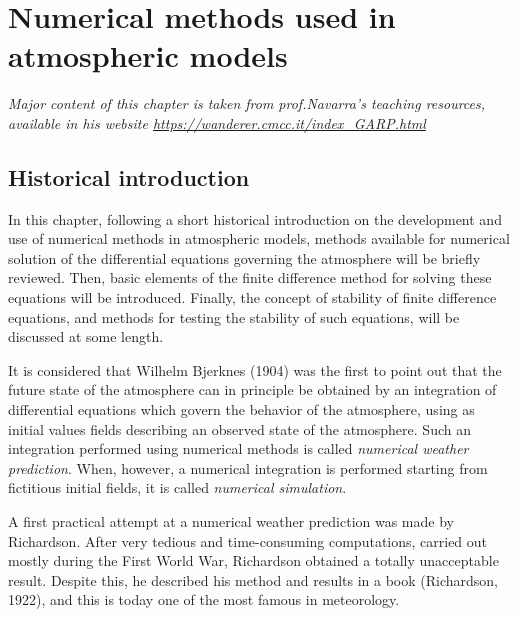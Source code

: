 \chapter{Numerical methods used in atmospheric models}

\begin{center}
	\textit{Major content of this chapter is taken from prof.Navarra's teaching resources, available in his website \url{https://wanderer.cmcc.it/index_GARP.html}}
\end{center}
\section{Historical introduction}
In this chapter, following a short historical introduction on the development and use of numerical methods in atmospheric models, methods available for numerical solution of the differential equations governing the atmosphere will be briefly reviewed. Then, basic elements of the finite difference method for solving these equations will be introduced. Finally, the concept of stability of finite difference equations, and methods for testing the stability of such equations, will be discussed at some length.

It is considered that Wilhelm Bjerknes (1904) was the first to point out that the future state of the atmosphere can in principle be obtained by an integration of differential equations which govern the behavior of the atmosphere, using as initial values fields describing an observed state of the atmosphere. Such an integration performed using numerical methods is called \textit{numerical weather prediction}. When, however, a numerical integration is performed starting from fictitious initial fields, it is called \textit{numerical simulation}.

A first practical attempt at a numerical weather prediction was made by Richardson. After very tedious and time-consuming computations, carried out mostly during the First World War, Richardson obtained a totally unacceptable result. Despite this, he described his method and results in a book (Richardson, 1922), and this is today one of the most famous in meteorology.

